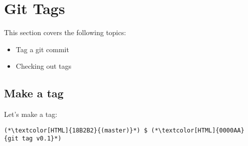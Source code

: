 \section{Git Tags}
\begin{frame}[fragile]
  \slidetitle

  This section covers the following topics:
  \begin{itemize}
    \item Tag a git commit
    \item Checking out tags
  \end{itemize}
\end{frame}

\subsection{Make a tag}
\begin{frame}[fragile]
  \subslidetitle

  Let's make a tag:
  \begin{lstlisting}
(*\textcolor[HTML]{18B2B2}{(master)}*) $ (*\textcolor[HTML]{0000AA}{git tag v0.1}*)
\end{lstlisting}

\end{frame}


